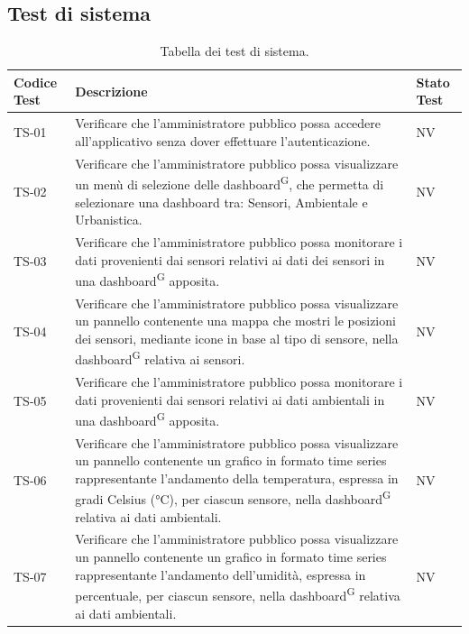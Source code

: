 \documentclass[8pt]{article}
\newcommand{\glossterm}[1]{#1\textsuperscript{G}} %
\begin{document}
\subsection{Test di sistema}
\renewcommand{\arraystretch}{2.5}
\begin{longtable}{|>{\centering}p{2cm}|>{\RaggedRight}m{12cm}|>{\centering\arraybackslash}p{2cm}|}
    \hline
    \rowcolor{white}
    \textbf{Codice Test} & \textbf{Descrizione} & \textbf{Stato Test} \\
    \hline
    \endfirsthead 
    \rowcolor{white}
    \caption{Tabella dei test di sistema.} 
    \label{table:Tabella dei test di sistema}
    \endlastfoot 
    TS-01 & Verificare che l'amministratore pubblico possa accedere all'applicativo
    senza dover effettuare l'autenticazione. & NV\\
    \hline
    TS-02 & Verificare che l'amministratore pubblico possa visualizzare un menù di selezione delle
    \glossterm{dashboard}, che permetta di selezionare una dashboard tra: Sensori, Ambientale e Urbanistica. & NV\\
    \hline
    TS-03 & Verificare che l'amministratore pubblico possa  monitorare i dati
    provenienti dai sensori relativi ai dati dei sensori in una \glossterm{dashboard} apposita.
    & NV \\
    \hline
    TS-04 & Verificare che l'amministratore pubblico possa visualizzare un pannello
    contenente una mappa che mostri le posizioni dei sensori, mediante icone in base al tipo di sensore, nella \glossterm{dashboard} relativa ai sensori.
    & NV \\
    \hline
    TS-05 & Verificare che l'amministratore pubblico possa monitorare i dati provenienti
    dai sensori relativi ai dati ambientali in una \glossterm{dashboard} apposita.
    & NV \\
    \hline
    TS-06 & Verificare che l'amministratore pubblico possa visualizzare un pannello
    contenente un grafico in formato time series rappresentante l'andamento della temperatura,
    espressa in gradi Celsius (°C), per ciascun sensore, nella \glossterm{dashboard} relativa ai dati ambientali.
    & NV \\
    \hline
    TS-07 & Verificare che l'amministratore pubblico possa visualizzare un pannello
    contenente un grafico in formato time series rappresentante l'andamento dell'umidità, espressa
    in percentuale, per ciascun sensore, nella \glossterm{dashboard} relativa ai dati ambientali.
    & NV \\

\end{longtable}
\end{document}
